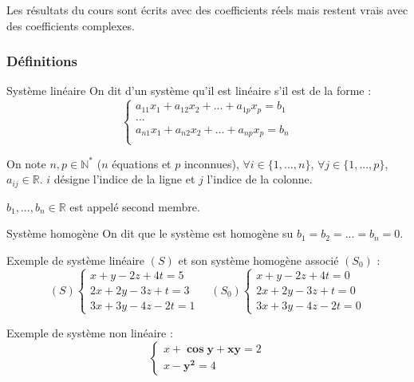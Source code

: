 \begin{rem}
Les résultats du cours sont écrits avec des coefficients réels mais restent vrais avec des coefficients complexes. 
\end{rem}

\subsubsection{Définitions}
\begin{defi}{Système linéaire}
On dit d'un système qu'il est linéaire s'il est de la forme :
$$
\left\{
\begin{array}{l}
a_{11}x_1 + a_{12}x_2 + ... + a_{1p}x_p = b_1 \\
... \\ 
a_{n1}x_1 + a_{n2}x_2 + ... + a_{np}x_p = b_n \\
\end{array}
\right.
$$

On note $n,p\in \mathbb{N}^*$ ($n$ équations et $p$ inconnues), $\forall i\in \{1,...,n\}$, $\forall j\in \{1,...,p\}$, $a_{ij} \in \mathbb{R}$. $i$ désigne l'indice de la ligne et $j$ l'indice de la colonne. 

$b_1, ..., b_n \in \mathbb{R}$ est appelé second membre. 
\end{defi}

\begin{defi}{Système homogène}
On dit que le système est homogène su $b_1=b_2=...=b_n=0$.
\end{defi}


\begin{exemple}
Exemple de système linéaire $(S)$ et son système homogène associé $(S_0)$ :
$$
(S) \left\{
\begin{array}{l}
x+y-2z + 4t = 5 \\
2x+2y-3z+t=3 \\
3x+3y-4z-2t=1
\end{array}
\right.
\quad
(S_0) \left\{
\begin{array}{l}
x+y-2z + 4t = 0 \\
2x+2y-3z+t=0 \\
3x+3y-4z-2t=0
\end{array}
\right.
$$

Exemple de système non linéaire :
$$
\left\{
\begin{array}{l}
x+\mathbf{\cos y} + \mathbf{xy} =2 \\
x-\mathbf{y^2} = 4
\end{array}
\right.$$

\end{exemple}

